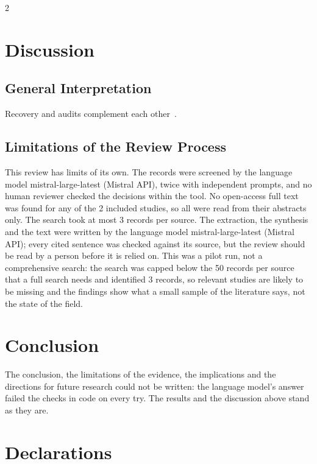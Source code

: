 \documentclass[10pt,a4paper]{article}
\begin{document}
\begin{multicols*}{2}

\section{Discussion}\label{sec:discussion}

\subsection{General Interpretation}\label{sec:general-interpretation}

Recovery and audits complement each other~\cite{doe2025agent,lee2026agent}.

\subsection{Limitations of the Review Process}\label{sec:limitations-of-the-review-process}

This review has limits of its own.
The records were screened by the language model mistral-large-latest (Mistral API), twice with independent prompts, and no human reviewer checked the decisions within the tool.
No open-access full text was found for any of the 2 included studies, so all were read from their abstracts only.
The search took at most 3 records per source.
The extraction, the synthesis and the text were written by the language model mistral-large-latest (Mistral API); every cited sentence was checked against its source, but the review should be read by a person before it is relied on.
This was a pilot run, not a comprehensive search: the search was capped below the 50 records per source that a full search needs and identified 3 records, so relevant studies are likely to be missing and the findings show what a small sample of the literature says, not the state of the field.

\section{Conclusion}\label{sec:conclusion}

The conclusion, the limitations of the evidence, the implications and the directions for future research could not be written: the language model's answer failed the checks in code on every try.
The results and the discussion above stand as they are.

\section{Declarations}\label{sec:declarations}


\end{multicols*}
\end{document}
